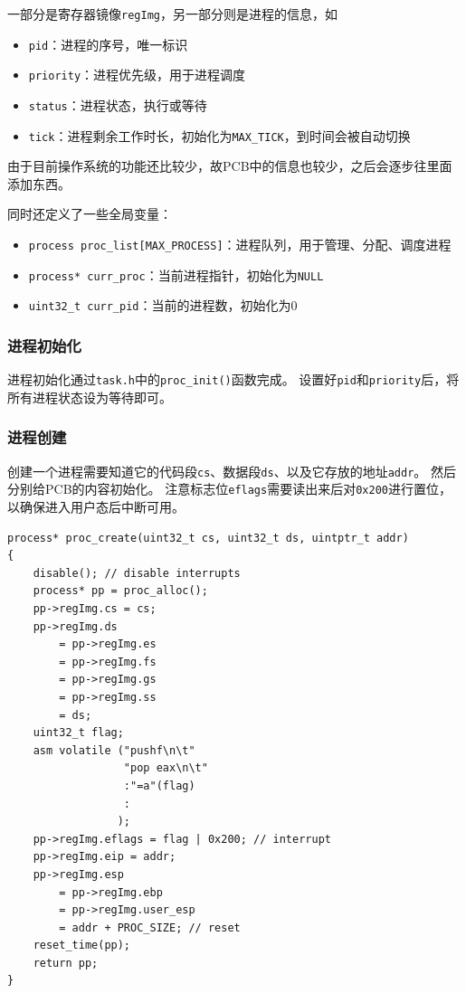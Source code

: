 \documentclass[logo,reportComp]{thesis}
\begin{document}
一部分是寄存器镜像\verb'regImg'，另一部分则是进程的信息，如
\begin{itemize}
	\item \verb'pid'：进程的序号，唯一标识
	\item \verb'priority'：进程优先级，用于进程调度
	\item \verb'status'：进程状态，执行或等待
	\item \verb'tick'：进程剩余工作时长，初始化为\verb'MAX_TICK'，到时间会被自动切换
\end{itemize}

由于目前操作系统的功能还比较少，故PCB中的信息也较少，之后会逐步往里面添加东西。

同时还定义了一些全局变量：
\begin{itemize}
	\item \verb'process proc_list[MAX_PROCESS]'：进程队列，用于管理、分配、调度进程
	\item \verb'process* curr_proc'：当前进程指针，初始化为\verb'NULL'
	\item \verb'uint32_t curr_pid'：当前的进程数，初始化为0
\end{itemize}

\subsubsection{进程初始化}
进程初始化通过\verb'task.h'中的\verb'proc_init()'函数完成。
设置好\verb'pid'和\verb'priority'后，将所有进程状态设为等待即可。

\subsubsection{进程创建}
创建一个进程需要知道它的代码段\verb'cs'、数据段\verb'ds'、以及它存放的地址\verb'addr'。
然后分别给PCB的内容初始化。
注意标志位\verb'eflags'需要读出来后对\verb'0x200'进行置位，以确保进入用户态后中断可用。
\begin{lstlisting}
process* proc_create(uint32_t cs, uint32_t ds, uintptr_t addr)
{
	disable(); // disable interrupts
	process* pp = proc_alloc();
	pp->regImg.cs = cs;
	pp->regImg.ds
		= pp->regImg.es
		= pp->regImg.fs
		= pp->regImg.gs
		= pp->regImg.ss
		= ds;
	uint32_t flag;
	asm volatile ("pushf\n\t"
				  "pop eax\n\t"
				  :"=a"(flag)
				  :
				 );
	pp->regImg.eflags = flag | 0x200; // interrupt
	pp->regImg.eip = addr;
	pp->regImg.esp
		= pp->regImg.ebp
		= pp->regImg.user_esp
		= addr + PROC_SIZE; // reset
	reset_time(pp);
	return pp;
}
\end{lstlisting}
\end{document}
